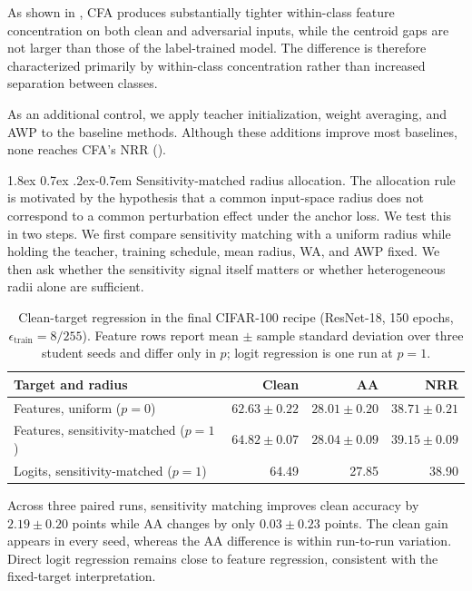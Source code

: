 \documentclass{article} %
\makeatletter
\theoremstyle{plain}
\renewcommand{\paragraph}{\@startsection{paragraph}{4}{\z@}%
  {1.8ex \@plus 0.7ex \@minus .2ex}{-0.7em}%
  {\normalfont\normalsize\bfseries}}
\makeatother
\begin{document}
As shown in , CFA produces substantially tighter
within-class feature concentration on both clean and adversarial inputs,
while the centroid gaps are not larger than those of the label-trained model.
The difference is therefore characterized primarily by within-class
concentration rather than increased separation between classes.

As an additional control, we apply teacher initialization, weight averaging,
and AWP to the baseline methods. Although these additions improve most
baselines, none reaches CFA's NRR ().


\paragraph{Sensitivity-matched radius allocation.}
The allocation rule is motivated by the hypothesis that a common input-space
radius does not correspond to a common perturbation effect under the anchor
loss. We test this in two steps. We first compare sensitivity matching with a
uniform radius while holding the teacher, training schedule, mean radius, WA,
and AWP fixed. We then ask whether the sensitivity signal itself matters or
whether heterogeneous radii alone are sufficient.
\begin{table}[!htbp]
  \centering
  \small
  \setlength{\tabcolsep}{5pt}
  \caption{
  Clean-target regression in the final CIFAR-100 recipe
  (ResNet-18, 150 epochs, \(\epsilon_{\mathrm{train}}=8/255\)).
  Feature rows report mean \(\pm\) sample standard deviation over three
  student seeds and differ only in \(p\); logit regression is one run at
  \(p=1\).
  }
  \label{tab:finalallocation}
  \begin{tabular}{lrrr}
    \toprule
    Target and radius & Clean & AA & NRR \\
    \midrule
    Features, uniform (\(p=0\))
      & \(62.63\pm0.22\)
      & \(28.01\pm0.20\)
      & \(38.71\pm0.21\) \\
    Features, sensitivity-matched (\(p=1\))
      & \(64.82\pm0.07\)
      & \(28.04\pm0.09\)
      & \(\mathbf{39.15\pm0.09}\) \\
    Logits, sensitivity-matched (\(p=1\))
      & 64.49 & 27.85 & 38.90 \\
    \bottomrule
  \end{tabular}
\end{table}

Across three paired runs, sensitivity matching improves clean accuracy by
\(2.19\pm0.20\) points while AA changes by only \(0.03\pm0.23\) points. The
clean gain appears in every seed, whereas the AA difference is within
run-to-run variation. Direct logit regression remains close to feature
regression, consistent with the fixed-target interpretation.
\end{document}

